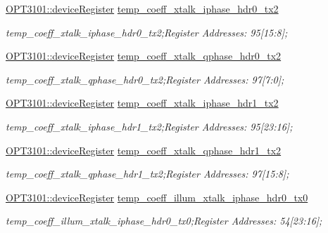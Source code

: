 \begin{DoxyCompactItemize}
\mbox{\hyperlink{class_o_p_t3101_1_1device_register}{O\+P\+T3101\+::device\+Register}} \mbox{\hyperlink{class_o_p_t3101_1_1registers_a824c1488c767ae6ddb8b967d61b8c8b3}{temp\+\_\+coeff\+\_\+xtalk\+\_\+iphase\+\_\+hdr0\+\_\+tx2}}
\begin{DoxyCompactList}\small\item\em temp\+\_\+coeff\+\_\+xtalk\+\_\+iphase\+\_\+hdr0\+\_\+tx2;Register Addresses\+: 95\mbox{[}15\+:8\mbox{]}; \end{DoxyCompactList}\item 
\mbox{\hyperlink{class_o_p_t3101_1_1device_register}{O\+P\+T3101\+::device\+Register}} \mbox{\hyperlink{class_o_p_t3101_1_1registers_a78cc3027c311e7e089ffc80aace9aba7}{temp\+\_\+coeff\+\_\+xtalk\+\_\+qphase\+\_\+hdr0\+\_\+tx2}}
\begin{DoxyCompactList}\small\item\em temp\+\_\+coeff\+\_\+xtalk\+\_\+qphase\+\_\+hdr0\+\_\+tx2;Register Addresses\+: 97\mbox{[}7\+:0\mbox{]}; \end{DoxyCompactList}\item 
\mbox{\hyperlink{class_o_p_t3101_1_1device_register}{O\+P\+T3101\+::device\+Register}} \mbox{\hyperlink{class_o_p_t3101_1_1registers_a7b269ecdb6950ec969bb44bf9628a0a2}{temp\+\_\+coeff\+\_\+xtalk\+\_\+iphase\+\_\+hdr1\+\_\+tx2}}
\begin{DoxyCompactList}\small\item\em temp\+\_\+coeff\+\_\+xtalk\+\_\+iphase\+\_\+hdr1\+\_\+tx2;Register Addresses\+: 95\mbox{[}23\+:16\mbox{]}; \end{DoxyCompactList}\item 
\mbox{\hyperlink{class_o_p_t3101_1_1device_register}{O\+P\+T3101\+::device\+Register}} \mbox{\hyperlink{class_o_p_t3101_1_1registers_a4bb6fd155228499f01bfe1cdbce10dec}{temp\+\_\+coeff\+\_\+xtalk\+\_\+qphase\+\_\+hdr1\+\_\+tx2}}
\begin{DoxyCompactList}\small\item\em temp\+\_\+coeff\+\_\+xtalk\+\_\+qphase\+\_\+hdr1\+\_\+tx2;Register Addresses\+: 97\mbox{[}15\+:8\mbox{]}; \end{DoxyCompactList}\item 
\mbox{\hyperlink{class_o_p_t3101_1_1device_register}{O\+P\+T3101\+::device\+Register}} \mbox{\hyperlink{class_o_p_t3101_1_1registers_a9f6d8fb387fbdb1313cd6342e17fd7c1}{temp\+\_\+coeff\+\_\+illum\+\_\+xtalk\+\_\+iphase\+\_\+hdr0\+\_\+tx0}}
\begin{DoxyCompactList}\small\item\em temp\+\_\+coeff\+\_\+illum\+\_\+xtalk\+\_\+iphase\+\_\+hdr0\+\_\+tx0;Register Addresses\+: 54\mbox{[}23\+:16\mbox{]}; \end{DoxyCompactList}\item 

\end{DoxyCompactItemize}
